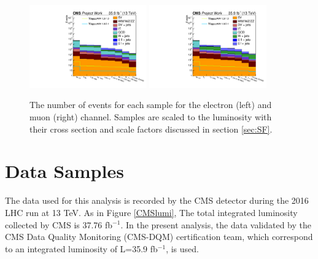  \begin{figure}[!hbt]
    \begin{center}
    \includegraphics[width=0.45\textwidth]{Plots/analysis/cutflow/electron}
     \includegraphics[width=0.45\textwidth]{Plots/analysis/cutflow/muon}
  \caption{ \label{fig:plotFlow} The number of events for each sample for the electron (left) and muon (right) channel. Samples are scaled to the luminosity with their cross section and scale factors discussed in section \ref{sec:SF}.
  }
   \end{center}
\end{figure}
\section{Data Samples}
The data used for this analysis is recorded by the CMS detector during the 2016 LHC run at 13 TeV.  As in Figure \ref{CMSlumi},   The total integrated luminosity collected by CMS is 37.76 fb$^{-1}$. In the present analysis, the data validated by the CMS Data Quality Monitoring (CMS-DQM) certification team, which correspond to an integrated luminosity of L=35.9 fb$^{-1}$, is used. 
